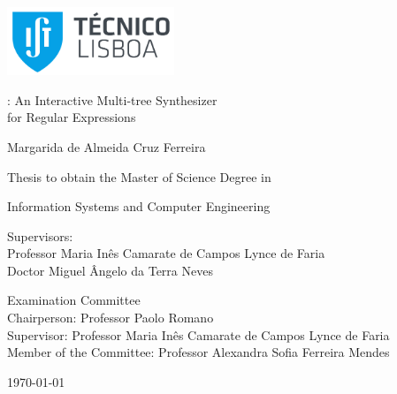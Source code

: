 \thispagestyle {empty}

\includegraphics[width=5cm]{pictures/IST_A.pdf}

\begin{center}

\vspace{2.5cm}
\vspace{1.0cm}
{\FontLb \Forest: An Interactive Multi-tree Synthesizer\\for Regular Expressions}


\vspace{2.7cm}
{\FontMb Margarida de Almeida Cruz Ferreira}

\vspace{2.0cm}
{\FontSn Thesis to obtain the Master of Science Degree in}

\vspace{0.3cm}
{\FontLb Information Systems and Computer Engineering}

\vspace{1.1cm}
{\FontSn %
	Supervisors:\\
	Professor Maria Inês Camarate de Campos Lynce de Faria\\
	Doctor Miguel Ângelo da Terra Neves

}

\vspace{1.1cm}
{\FontMb Examination Committee} \\

\vspace{0.5cm}
{
\FontSn %
Chairperson: Professor Paolo Romano\\
Supervisor: Professor Maria Inês Camarate de Campos Lynce de Faria \\
Member of the Committee: Professor Alexandra Sofia Ferreira Mendes
}

\vspace{1.5cm}
{\FontMb \monthyeardate\today}

\end{center}

\cleardoublepage

